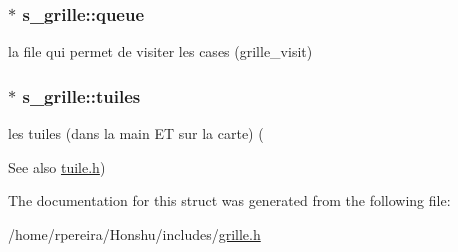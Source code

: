 \subsubsection[{\texorpdfstring{queue}{queue}}]{$\ast$ s\+\_\+grille\+::queue}\hypertarget{structs__grille_afa494c65bda9a2ab166fcf495911f919}{}\label{structs__grille_afa494c65bda9a2ab166fcf495911f919}
la file qui permet de visiter les cases (grille\+\_\+visit) 
\subsubsection[{\texorpdfstring{tuiles}{tuiles}}]{$\ast$ s\+\_\+grille\+::tuiles}\hypertarget{structs__grille_a80d9aee68750a4c4c5cae8185c74b7b1}{}\label{structs__grille_a80d9aee68750a4c4c5cae8185c74b7b1}
les tuiles (dans la main ET sur la carte) (\begin{DoxySeeAlso}{See also}
\hyperlink{tuile_8h}{tuile.\+h}) 
\end{DoxySeeAlso}


The documentation for this struct was generated from the following file\+:\begin{DoxyCompactItemize}
\item 
/home/rpereira/\+Honshu/includes/\hyperlink{grille_8h}{grille.\+h}\end{DoxyCompactItemize}
